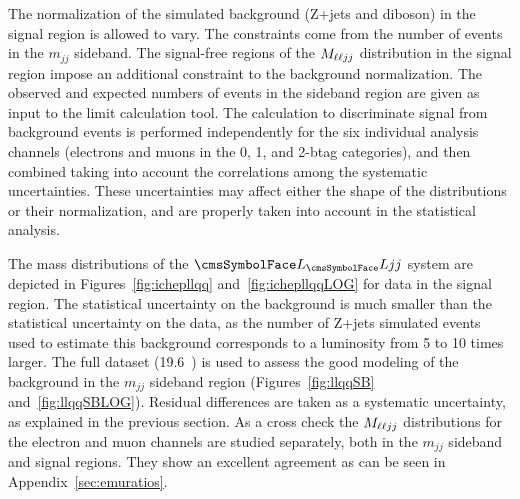 The normalization of the simulated background (Z+jets and diboson) in the signal region is allowed to vary.  The constraints come from the number of events in the $m_{jj}$ sideband. The signal-free regions of the $M_{\ell\ell jj}$ distribution in the signal region impose an additional constraint to the background normalization. The observed and expected numbers of events in the sideband region are given as input to the limit calculation tool. The calculation to discriminate signal from background events is performed independently for the six individual analysis channels (electrons and muons in the 0, 1, and 2-btag categories), and then combined taking into account the correlations among the systematic uncertainties. These uncertainties may affect either the shape of the distributions or their normalization, and are properly taken into account in the statistical analysis.

The mass distributions of the $\LL jj$ system are depicted in Figures~\ref{fig:ichepllqq} and~\ref{fig:ichepllqqLOG} for data in the signal region. The statistical uncertainty on the background is much smaller than the statistical uncertainty on the data, as the number of Z+jets simulated events used to estimate this background corresponds to a luminosity from 5 to 10 times larger. The full dataset (19.6~\fbinv{}) is used to assess the good modeling of the background in the $m_{jj}$ sideband region (Figures~\ref{fig:llqqSB} and~\ref{fig:llqqSBLOG}). Residual differences are taken as a systematic uncertainty, as explained in the previous section. As a cross check the $M_{\ell\ell jj}$ distributions for the electron and muon channels are studied separately, both in the $m_{jj}$ sideband and signal regions.  They show an excellent agreement as can be seen in Appendix~\ref{sec:emuratios}.

